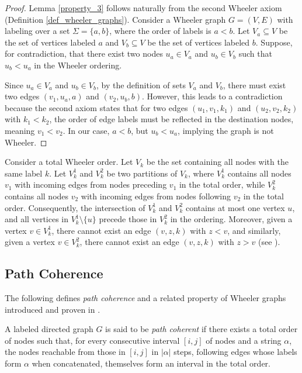 \begin{proof}
    Lemma \ref{property_3} follows naturally from the second Wheeler axiom (Definition \ref{def_wheeler_graphs}). Consider a Wheeler graph $G=(V,E)$ with labeling over a set $\Sigma=\{a,b\}$, where the order of labels is $a<b$. Let $V_a \subseteq V$ be the set of vertices labeled $a$ and $V_b \subseteq V$ be the set of vertices labeled $b$. Suppose, for contradiction, that there exist two nodes $u_a \in V_a$ and $u_b \in V_b$ such that $u_b < u_a$ in the Wheeler ordering.
    
    Since $u_a \in V_a$ and $u_b \in V_b$, by the definition of sets $V_a$ and $V_b$, there must exist two edges $(v_1, u_a, a)$ and $(v_2, u_b, b)$. However, this leads to a contradiction because the second axiom states that for two edges $(u_1,v_1,k_1)$ and $(u_2,v_2,k_2)$ with $k_1<k_2$, the order of edge labels must be reflected in the destination nodes, meaning $v_1<v_2$. In our case, $a<b$, but $u_b < u_a$, implying the graph is not Wheeler.
\end{proof}

\begin{lemma} \label{property_4}
    Consider a total Wheeler order. Let $V_k$ be the set containing all nodes with the same label $k$. Let $V_k^1$ and $V_k^2$ be two partitions of $V_k$, where $V_k^1$ contains all nodes $v_1$ with incoming edges from nodes preceding $v_1$ in the total order, while $V_k^2$ contains all nodes $v_2$ with incoming edges from nodes following $v_2$ in the total order. Consequently, the intersection of $V_k^1$ and $V_k^2$ contains at most one vertex $u$, and all vertices in $V_k^1 \setminus \{u\}$ precede those in $V_k^2$ in the ordering. Moreover, given a vertex $v \in V_k^1$, there cannot exist an edge $(v, z, k)$ with $z<v$, and similarly, given a vertex $v \in V_k^2$, there cannot exist an edge $(v, z, k)$ with $z>v$ (see \cite{15}).
\end{lemma}

\subsection{Path Coherence}
The following defines \textit{path coherence} and a related property of Wheeler graphs introduced and proven in \cite{1}.

\begin{definition}
    A labeled directed graph $G$ is said to be \textit{path coherent} if there exists a total order of nodes such that, for every consecutive interval $[i, j]$ of nodes and a string $\alpha$, the nodes reachable from those in $[i, j]$ in $|\alpha |$ steps, following edges whose labels form $\alpha$ when concatenated, themselves form an interval in the total order.
\end{definition}

